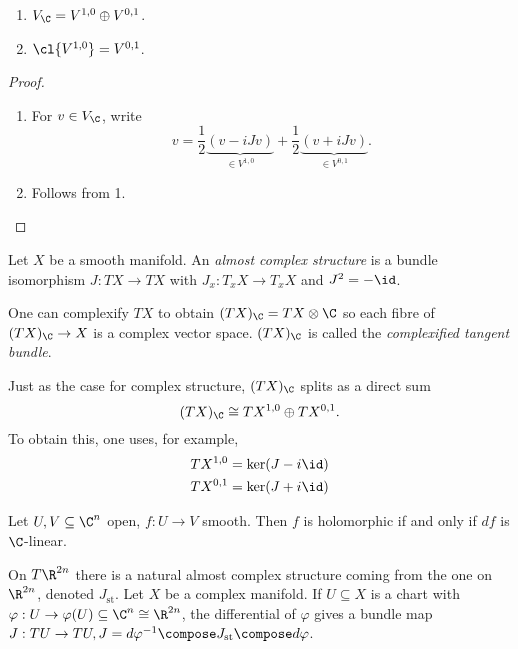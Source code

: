 \documentclass[a4paper]{article}
\begin{document}
\begin{lemma}\leavevmode
  \begin{enumerate}
  \item \(V_\C = V^{1, 0} \oplus V^{0, 1}\).
  \item \(\cl{V^{1, 0}} = V^{0, 1}\).
  \end{enumerate}
\end{lemma}

\begin{proof}\leavevmode
  \begin{enumerate}
  \item For \(v \in V_\C\), write
    \[
      v = \frac{1}{2}\underbrace{(v - iJv)}_{\in V^{1, 0}} + \frac{1}{2}\underbrace{(v + i Jv)}_{\in V^{0, 1}}.
    \]
  \item Follows from 1.
  \end{enumerate}
\end{proof}

\begin{definition}
  Let \(X\) be a smooth manifold. An \emph{almost complex structure} is a bundle isomorphism \(J: TX \to TX\) with \(J_x: T_xX \to T_xX\) and \(J^2 = -\id\).
\end{definition}

One can complexify \(TX\) to obtain \((TX)_\C = TX \otimes \C\) so each fibre of \((TX)_\C \to X\) is a complex vector space. \((TX)_\C\) is called the \emph{complexified tangent bundle}.

Just as the case for complex structure, \((TX)_\C\) splits as a direct sum
\[
  (TX)_\C \cong TX^{1, 0} \oplus TX^{0, 1}.
\]
To obtain this, one uses, for example,
\begin{align*}
  TX^{1, 0} &= \ker (J - i \id) \\
  TX^{0, 1} &= \ker (J + i \id)
\end{align*}

\begin{ex}
  Let \(U, V \subseteq \C^n\) open, \(f: U \to V\) smooth. Then \(f\) is holomorphic if and only if \(df\) is \(\C\)-linear.
\end{ex}

On \(T\R^{2n}\) there is a natural almost complex structure coming from the one on \(\R^{2n}\), denoted \(J_{\text{st}}\). Let \(X\) be a complex manifold. If  \(U \subseteq X\) is a chart with \(\varphi: U \to \varphi(U) \subseteq \C^n \cong \R^{2n}\), the differential of \(\varphi\) gives a bundle map \(J: TU \to TU, J = d\varphi^{-1} \compose J_{\text{st}} \compose d\varphi\).
\end{document}
